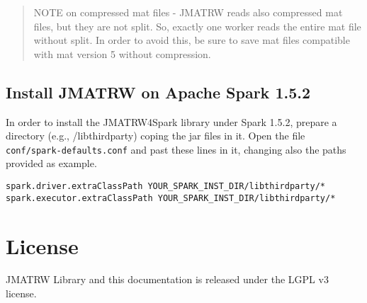 \documentclass[
10pt, %
a4paper, %
oneside, %
headinclude,footinclude, %
BCOR5mm, %
]{scrartcl}
\begin{document}
\begin{quote}
NOTE on compressed mat files - JMATRW reads also compressed mat files, but they are not split. So, exactly one worker reads the entire mat file without split. In order to avoid this, be sure to save mat files compatible with mat version 5 without compression.
\end{quote}

\subsection{Install JMATRW on Apache Spark 1.5.2}

In order to install the JMATRW4Spark library under Spark 1.5.2, prepare a directory (e.g., /libthirdparty) coping the jar files in it. Open the file \verb|conf/spark-defaults.conf| and past these lines in it, changing also the paths provided as example.

\begin{verbatim}
spark.driver.extraClassPath YOUR_SPARK_INST_DIR/libthirdparty/*
spark.executor.extraClassPath YOUR_SPARK_INST_DIR/libthirdparty/*
\end{verbatim}

\section{License}

JMATRW Library and this documentation is released under the LGPL v3 license. 





%


\end{document}
